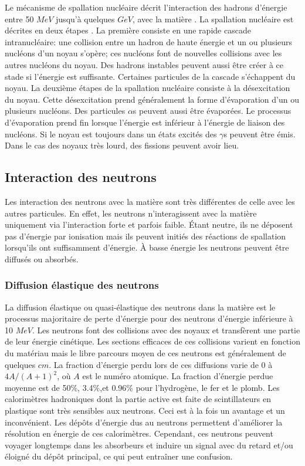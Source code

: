 Le mécanisme de spallation nucléaire décrit l'interaction des hadrons d'énergie entre 50 $MeV$ jusqu'à quelques $GeV$, avec la matière . La spallation nucléaire est décrites en deux étapes \cite{wigmans}. La première consiste en une rapide cascade intranucléaire: une collision entre un hadron de haute énergie et un ou plusieurs nucléons d'un noyau s'opère; ces nucléons font de nouvelles collisions avec les autres nucléons du noyau. Des hadrons instables peuvent aussi être créer à ce stade si l'énergie est suffisante. Certaines particules de la cascade s'échappent du noyau. La deuxième étapes de la spallation nucléaire consiste à la désexcitation du noyau. Cette désexcitation prend généralement la forme d'évaporation d'un ou plusieurs nucléons. Des particules $\alpha$s peuvent aussi être évaporées. Le processus d'évaporation prend fin lorsque l'énergie est inférieur à l'énergie de liaison des nucléons. Si le noyau est toujours dans un états excités des $\gamma$s peuvent être émis. Dans le cas des noyaux très lourd, des fissions peuvent avoir lieu. 
\subsection{Interaction des neutrons}
Les interaction des neutrons avec la matière sont très différentes de celle avec les autres particules. En effet, les neutrons n'interagissent avec la matière uniquement via l'interaction forte et parfois faible. Étant neutre, ils ne déposent pas d'énergie par ionisation mais ils peuvent initiés des réactions de spallation lorsqu'ils ont suffisamment d'énergie. À basse énergie les neutrons peuvent être diffusés ou absorbés.
\subsubsection{Diffusion élastique des neutrons}
La diffusion élastique ou quasi-élastique des neutrons dans la matière est le processus majoritaire de perte d'énergie pour des neutrons d'énergie inférieure à 10 $MeV$. Les neutrons font des collisions avec des noyaux et transfèrent une partie de leur énergie cinétique. Les sections efficaces de ces collisions varient en fonction du matériau mais le libre parcours moyen de ces neutrons est généralement de quelques $cm$. La fraction d'énergie perdu lors de ces diffusions varie de 0 à $4A/(A+1)^2$, où $A$ est le numéro atomique. La fraction d'énergie perdue moyenne est de 50$\%$, 3.4$\%$,et 0.96$\%$ pour l'hydrogène, le fer et le plomb. Les calorimètres hadroniques dont la partie active est faite de scintillateurs en plastique sont très sensibles aux neutrons. Ceci est à la fois un avantage et un inconvénient. Les dépôts d'énergie dus au neutrons permettent d'améliorer la résolution en énergie de ces calorimètres. Cependant, ces neutrons peuvent voyager longtemps dans les absorbeurs et induire un signal avec du retard et/ou éloigné du dépôt principal, ce qui peut entraîner une confusion. 
